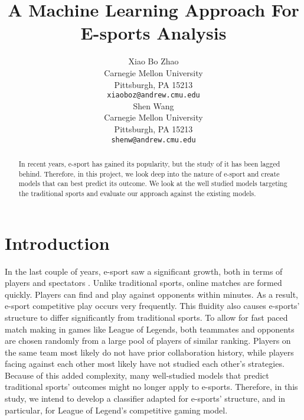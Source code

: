 \documentclass{article} %
\title{A Machine Learning Approach For E-sports Analysis}
\author{
Xiao Bo Zhao\\
Carnegie Mellon University\\
Pittsburgh, PA 15213 \\
\texttt{xiaoboz@andrew.cmu.edu} \\
\And
Shen Wang\\
Carnegie Mellon University\\
Pittsburgh, PA 15213 \\
\texttt{shenw@andrew.cmu.edu} \\
}
\begin{document}
\maketitle

\begin{abstract}
In recent years, e-sport has gained its popularity, but the study of it has been lagged behind. Therefore, in this project, we look deep into the nature of e-sport and create models that can best predict its outcome. We look at the well studied models targeting the traditional sports and evaluate our approach against the existing models.
\end{abstract}

\section{Introduction}
In the last couple of years, e-sport saw a significant growth, both in terms of players and spectators \cite{Witkowski:2013:ERC:2513002.2513008}. Unlike traditional sports, online matches are formed quickly. Players can find and play against opponents within minutes. As a result, e-sport competitive play occurs very frequently. This fluidity also causes e-sports’ structure to differ significantly from traditional sports. To allow for fast paced match making in games like League of Legends, both teammates and opponents are chosen randomly from a large pool of players of similar ranking. Players on the same team most likely do not have prior collaboration history, while players facing against each other most likely have not studied each other’s strategies. Because of this added complexity, many well-studied models that predict traditional sports’ outcomes might no longer apply to e-sports. Therefore, in this study, we intend to develop a classifier adapted for e-sports’ structure, and in particular, for League of Legend’s competitive gaming model.

\end{document}
